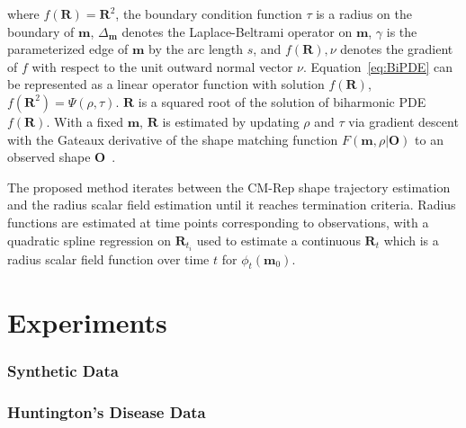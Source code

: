 \documentclass{llncs}
\begin{document}
where $f(\mathbf{R}) = \mathbf{R}^2$, the boundary condition function $\tau$ is a radius on the boundary of $\mathbf{m}$, $\Delta_{\mathbf{m}}$ denotes the Laplace-Beltrami operator on $\mathbf{m}$, $\gamma$ is the parameterized edge of $\mathbf{m}$ by the arc length $s$, and $f(\mathbf{R}), \nu$ denotes the gradient of $f$ with respect to the unit outward normal vector $\nu$. 
Equation~\ref{eq:BiPDE} can be represented as a linear operator function with solution $f(\mathbf{R})$, $f(\mathbf{R}^2) = \Psi( \rho, \tau)$.
$\mathbf{R}$ is a squared root of the solution of biharmonic PDE $f(\mathbf{R})$. 
With a fixed $\mathbf{m}$, $\mathbf{R}$ is estimated by updating $\rho$ and $\tau$ via gradient descent with the Gateaux derivative of the shape matching function $F( \mathbf{m}, \rho | \mathbf{O})$ to an observed shape $\mathbf{O}$~\cite{Yushkevich2006}.

The proposed method iterates between the CM-Rep shape trajectory estimation and the radius scalar field estimation until it reaches termination criteria. 
Radius functions are estimated at time points corresponding to observations, with a quadratic spline regression on $\mathbf{R}_{t_i}$ used to estimate a continuous $\mathbf{R}_t$ which is a radius scalar field function over time $t$ for $\phi_t(\mathbf{m}_0)$. 

\section{Experiments}
\label{sec:Exp}

\subsubsection{Synthetic Data}
\label{ssec:Synthetic}



\subsubsection{Huntington's Disease Data}
\label{ssec:HD}
\end{document}
